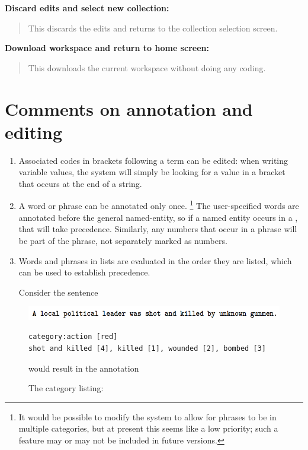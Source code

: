 \documentclass[letterpaper,10pt,english]{sphinxmanual}
\begin{document}
\textbf{Discard edits and select new collection:}
\begin{quote}

This discards the edits and returns to the collection selection screen.
\end{quote}

\textbf{Download workspace and return to home screen:}
\begin{quote}

This downloads the current workspace without doing any coding.
\end{quote}


\section{Comments on annotation and editing}
\label{annotation:comments-on-annotation-and-editing}\begin{enumerate}
\item {} 
Associated codes in brackets following a term can be edited: when
writing variable values, the system will simply be looking for a
value in a bracket that occurs at the end of a string.

\item {} 
A word or phrase can be annotated only once. \footnote{
It would be possible to modify the system to allow for phrases to be
in multiple categories, but at present this seems like a low
priority; such a feature may or may not be included in future
versions.
} The user-specified
 words are annotated before the general named-entity, so
if a named entity occurs in a , that will take
precedence. Similarly, any numbers that occur in a 
phrase will be part of the phrase, not separately marked as numbers.

\item {} 
Words and phrases in  lists are evaluated in the order
they are listed, which can be used to establish precedence.

Consider the sentence

\end{enumerate}
\begin{figure}[htbp]
\centering
\capstart

\includegraphics{annotation0.png}
\caption{The category listing:}{\small 
\begin{Verbatim}[commandchars=\\\{\}]
category:action [red]
shot and killed [4], killed [1], wounded [2], bombed [3]
\end{Verbatim}

would result in the annotation
}\end{figure}
\end{document}
